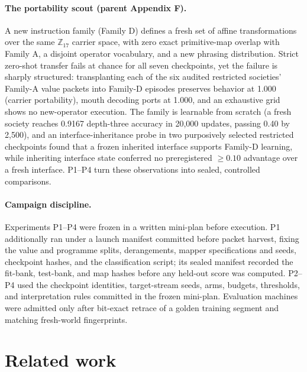 \documentclass[11pt]{article}
\begin{document}
\paragraph{The portability scout (parent Appendix F).} A new instruction family (Family D) defines a fresh set of affine transformations over the same $\mathbb{Z}_{17}$ carrier space, with zero exact primitive-map overlap with Family A, a disjoint operator vocabulary, and a new phrasing distribution. Strict zero-shot transfer fails at chance for all seven checkpoints, yet the failure is sharply structured: transplanting each of the six audited restricted societies' Family-A value packets into Family-D episodes preserves behavior at 1.000 (carrier portability), mouth decoding ports at 1.000, and an exhaustive grid shows no new-operator execution. The family is learnable from scratch (a fresh society reaches 0.9167 depth-three accuracy in 20{,}000 updates, passing 0.40 by 2{,}500), and an interface-inheritance probe in two purposively selected restricted checkpoints found that a frozen inherited interface supports Family-D learning, while inheriting interface state conferred no preregistered $\geq 0.10$ advantage over a fresh interface. P1--P4 turn these observations into sealed, controlled comparisons.

\paragraph{Campaign discipline.} Experiments P1--P4 were frozen in a written mini-plan before execution. P1 additionally ran under a launch manifest committed before packet harvest, fixing the value and programme splits, derangements, mapper specifications and seeds, checkpoint hashes, and the classification script; its sealed manifest recorded the fit-bank, test-bank, and map hashes before any held-out score was computed. P2--P4 used the checkpoint identities, target-stream seeds, arms, budgets, thresholds, and interpretation rules committed in the frozen mini-plan. Evaluation machines were admitted only after bit-exact retrace of a golden training segment and matching fresh-world fingerprints.

\section{Related work}\label{sec:related}
\end{document}
